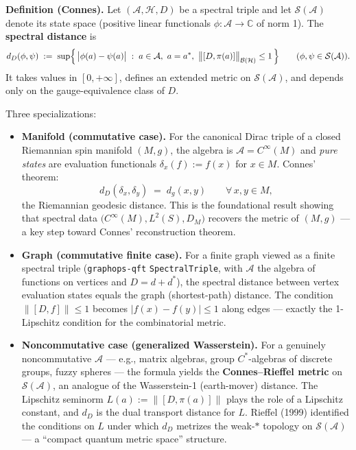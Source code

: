 \documentclass[
  11pt,
]{article}
\providecommand{\tightlist}{%
  \setlength{\itemsep}{0pt}\setlength{\parskip}{0pt}}
\begin{document}
\textbf{Definition (Connes).} Let \((\mathcal{A}, \mathcal{H}, D)\) be a
spectral triple and let \(\mathcal{S}(\mathcal{A})\) denote its state
space (positive linear functionals
\(\phi\colon \mathcal{A}\to \mathbb{C}\) of norm 1). The
\textbf{spectral distance} is \[
d_D(\phi, \psi) \;:=\; \sup\Bigl\{\,\bigl|\phi(a) - \psi(a)\bigr| \;:\; a \in \mathcal{A},\ a = a^*,\ \bigl\|[D, \pi(a)]\bigr\|_{\mathcal{B}(\mathcal{H})} \leq 1\,\Bigr\}
\qquad (\phi, \psi \in \mathcal{S}(\mathcal{A})).
\] It takes values in \([0, +\infty]\), defines an extended metric on
\(\mathcal{S}(\mathcal{A})\), and depends only on the gauge-equivalence
class of \(D\).

Three specializations:

\begin{itemize}
\tightlist
\item
  \textbf{Manifold (commutative case).} For the canonical Dirac triple
  of a closed Riemannian spin manifold \((M, g)\), the algebra is
  \(\mathcal{A}= C^\infty(M)\) and \emph{pure states} are evaluation
  functionals \(\delta_x(f) := f(x)\) for \(x \in M\). Connes' theorem:
  \[d_D(\delta_x, \delta_y) \;=\; d_g(x, y) \qquad \forall\, x, y \in M,\]
  the Riemannian geodesic distance. This is the foundational result
  showing that spectral data \(\bigl(C^\infty(M), L^2(S), D_M\bigr)\)
  recovers the metric of \((M, g)\) --- a key step toward Connes'
  reconstruction theorem.
\item
  \textbf{Graph (commutative finite case).} For a finite graph viewed as
  a finite spectral triple (\texttt{graphops-qft}
  \texttt{SpectralTriple}, with \(\mathcal{A}\) the algebra of functions
  on vertices and \(D = d + d^*\)), the spectral distance between vertex
  evaluation states equals the graph (shortest-path) distance. The
  condition \(\|[D, f]\| \leq 1\) becomes \(|f(x) - f(y)| \leq 1\) along
  edges --- exactly the 1-Lipschitz condition for the combinatorial
  metric.
\item
  \textbf{Noncommutative case (generalized Wasserstein).} For a
  genuinely noncommutative \(\mathcal{A}\) --- e.g., matrix algebras,
  group \(C^*\)-algebras of discrete groups, fuzzy spheres --- the
  formula yields the \textbf{Connes--Rieffel metric} on
  \(\mathcal{S}(\mathcal{A})\), an analogue of the Wasserstein-1
  (earth-mover) distance. The Lipschitz seminorm
  \(L(a) := \|[D, \pi(a)]\|\) plays the role of a Lipschitz constant,
  and \(d_D\) is the dual transport distance for \(L\). Rieffel (1999)
  identified the conditions on \(L\) under which \(d_D\) metrizes the
  weak-\(*\) topology on \(\mathcal{S}(\mathcal{A})\) --- a ``compact
  quantum metric space'' structure.
\end{itemize}
\end{document}
